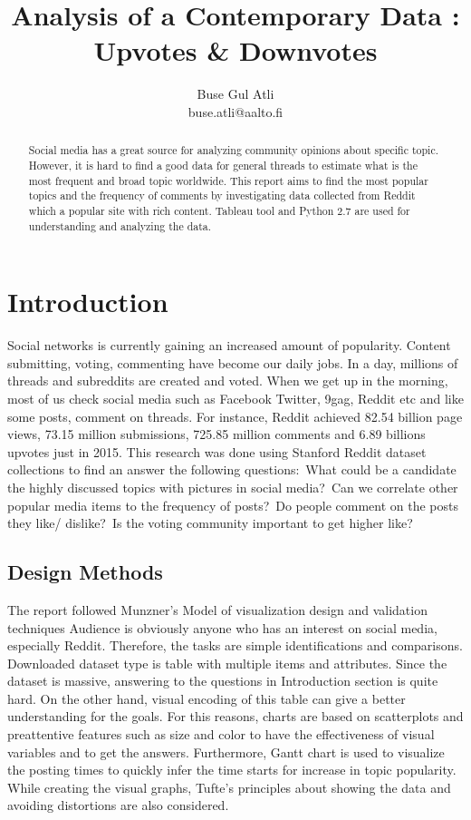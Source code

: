 \documentclass[a4paper]{article}
\title{Analysis of a Contemporary Data : Upvotes \& Downvotes}
\author{Buse Gul Atli \\ buse.atli@aalto.fi}
\begin{document}
\maketitle

\begin{abstract}
Social media has a great source for analyzing community opinions about specific topic. However, it is hard to find a good data for general threads to estimate what is the most frequent and broad topic worldwide. This report aims to find the most popular topics and the frequency of comments by investigating data collected from Reddit which a popular site with rich content. Tableau tool and Python 2.7 are used for understanding and analyzing the data.  
\end{abstract}

\section{Introduction}
Social networks is currently gaining an increased amount of popularity. Content submitting, voting, commenting have become our daily jobs. In a day, millions of threads and subreddits are created and voted. When we get up in the morning, most of us check social media such as Facebook Twitter, 9gag, Reddit etc and like some posts, comment on threads. For instance, Reddit achieved 82.54 billion page views, 73.15 million submissions, 725.85 million comments and 6.89 billions upvotes just in 2015\cite{intro}. This research was done using Stanford Reddit dataset collections to find an answer the following questions:\
What could be a candidate the highly discussed topics with pictures in social media?\
Can we correlate other popular media items to the frequency of posts?\
Do people comment on the posts they like/ dislike?\
Is the voting community important to get higher like?\
\subsection{Design Methods}
The report followed Munzner's Model of visualization design and validation techniques \cite{munzner} Audience is obviously anyone who has an interest on social media, especially Reddit. Therefore, the tasks are simple identifications and comparisons. Downloaded dataset type is table with multiple items and attributes. Since the dataset is massive, answering to the questions in Introduction section is quite hard. On the other hand, visual encoding of this table can give a better understanding for the goals. For this reasons, charts are based on scatterplots and preattentive features such as size and color to have the effectiveness of visual variables and to get the answers. Furthermore, Gantt chart is used to visualize the posting times to quickly infer the time starts for increase in topic popularity. While creating the visual graphs, Tufte's principles about showing the data and avoiding distortions are also considered.
\end{document}
